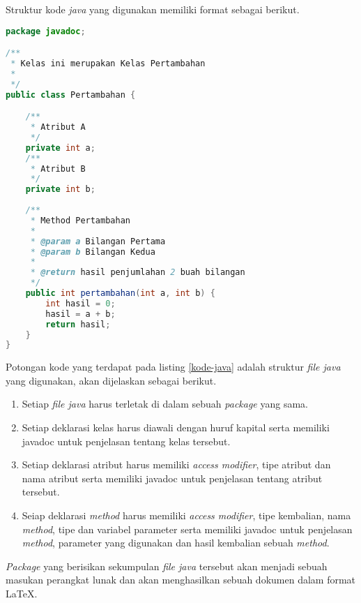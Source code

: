 Struktur kode {\it java} yang digunakan memiliki format sebagai berikut.

\begin{lstlisting}[language=Java, caption=Potongan kode {\it java}, label={kode-java}]
package javadoc;

/**
 * Kelas ini merupakan Kelas Pertambahan
 *
 */
public class Pertambahan {

    /**
     * Atribut A
     */
    private int a;
    /**
     * Atribut B
     */
    private int b;
    
    /**
     * Method Pertambahan
     *
     * @param a Bilangan Pertama
     * @param b Bilangan Kedua
     * 
     * @return hasil penjumlahan 2 buah bilangan
     */
    public int pertambahan(int a, int b) {
        int hasil = 0;
        hasil = a + b;
        return hasil;
    }
}
\end{lstlisting}

Potongan kode yang terdapat pada listing \ref{kode-java} adalah struktur {\it file java} yang digunakan, akan dijelaskan sebagai berikut.

\begin{enumerate}
	\item Setiap {\it file java} harus terletak di dalam sebuah {\it package} yang sama.
	\item Setiap deklarasi kelas harus diawali dengan huruf kapital serta memiliki javadoc untuk penjelasan tentang kelas tersebut.
	\item Setiap deklarasi atribut harus memiliki {\it access modifier}, tipe atribut dan nama atribut serta memiliki javadoc untuk penjelasan tentang atribut tersebut.
	\item Seiap deklarasi {\it method} harus memiliki {\it access modifier}, tipe kembalian, nama {\it method}, tipe dan variabel parameter serta memiliki javadoc untuk penjelasan {\it method}, parameter yang digunakan dan hasil kembalian sebuah {\it method}.
\end{enumerate}

{\it Package} yang berisikan sekumpulan {\it file java} tersebut akan menjadi sebuah masukan perangkat lunak dan akan menghasilkan sebuah dokumen dalam format \LaTeX.

